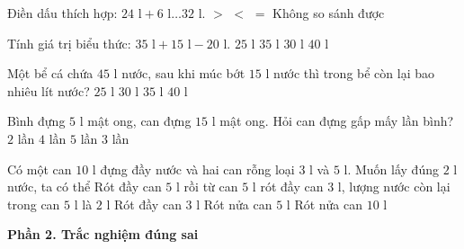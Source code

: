 \begin{ex} %
Điền dấu thích hợp: $24\text{ l} + 6\text{ l} \dots 32\text{ l}$.
\choice
{$>$}
{\True $<$}
{$=$}
{Không so sánh được}
\end{ex}

\begin{ex} %
Tính giá trị biểu thức: $35\text{ l} + 15\text{ l} - 20\text{ l}$.
\choice
{$25\text{ l}$}
{$35\text{ l}$}
{\True $30\text{ l}$}
{$40\text{ l}$}
\end{ex}

\begin{ex} %
Một bể cá chứa $45\text{ l}$ nước, sau khi múc bớt $15\text{ l}$ nước thì trong bể còn lại bao nhiêu lít nước?
\choice
{$25\text{ l}$}
{\True $30\text{ l}$}
{$35\text{ l}$}
{$40\text{ l}$}
\end{ex}

\begin{ex} %
Bình đựng $5\text{ l}$ mật ong, can đựng $15\text{ l}$ mật ong. Hỏi can đựng gấp mấy lần bình?
\choice
{$2$ lần}
{$4$ lần}
{$5$ lần}
{\True $3$ lần}
\end{ex}

\begin{ex} %
Có một can $10\text{ l}$ đựng đầy nước và hai can rỗng loại $3\text{ l}$ và $5\text{ l}$. Muốn lấy đúng $2\text{ l}$ nước, ta có thể
\choice
{\True Rót đầy can $5\text{ l}$ rồi từ can $5\text{ l}$ rót đầy can $3\text{ l}$, lượng nước còn lại trong can $5\text{ l}$ là $2\text{ l}$}
{Rót đầy can $3\text{ l}$}
{Rót nửa can $5\text{ l}$}
{Rót nửa can $10\text{ l}$}
\end{ex}

\textbf{Phần 2. Trắc nghiệm đúng sai}

